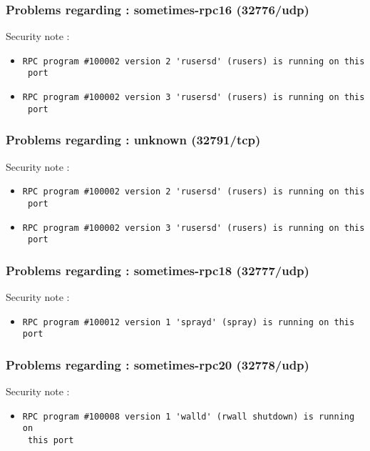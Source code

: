\documentclass{article}
\begin{document}
\subsubsection{Problems regarding : sometimes-rpc16 (32776/udp)}
Security note :\\
\begin{itemize}
\item \begin{verbatim}
RPC program #100002 version 2 'rusersd' (rusers) is running on this
 port
\end{verbatim}\item \begin{verbatim}
RPC program #100002 version 3 'rusersd' (rusers) is running on this
 port
\end{verbatim}\end{itemize}
\subsubsection{Problems regarding : unknown (32791/tcp)}
Security note :\\
\begin{itemize}
\item \begin{verbatim}
RPC program #100002 version 2 'rusersd' (rusers) is running on this
 port
\end{verbatim}\item \begin{verbatim}
RPC program #100002 version 3 'rusersd' (rusers) is running on this
 port
\end{verbatim}\end{itemize}
\subsubsection{Problems regarding : sometimes-rpc18 (32777/udp)}
Security note :\\
\begin{itemize}
\item \begin{verbatim}
RPC program #100012 version 1 'sprayd' (spray) is running on this port
\end{verbatim}\end{itemize}
\subsubsection{Problems regarding : sometimes-rpc20 (32778/udp)}
Security note :\\
\begin{itemize}
\item \begin{verbatim}
RPC program #100008 version 1 'walld' (rwall shutdown) is running on
 this port
\end{verbatim}\end{itemize}
\end{document}
